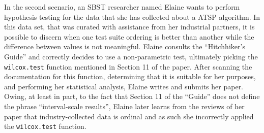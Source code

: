 In the second scenario, an SBST researcher named Elaine wants to perform hypothesis testing for the data that she has
collected about a ATSP algorithm. In this data set, that was curated with assistance from her industrial partners, it is
possible to discern when one test suite ordering is better than another while the difference between values is not
meaningful. Elaine consults the ``Hitchhiker's Guide'' and correctly decides to use a non-parametric test, ultimately
picking the {\tt wilcox.test} function mentioned in Section 11 of the paper. After scanning the documentation for this
function, determining that it is suitable for her purposes, and performing her statistical analysis, Elaine writes and
submits her paper. Owing, at least in part, to the fact that Section 11 of the ``Guide'' does not define the phrase
``interval-scale results'', Elaine later learns from the reviews of her paper that industry-collected data is ordinal and
as such she incorrectly applied the {\tt wilcox.test} function.


